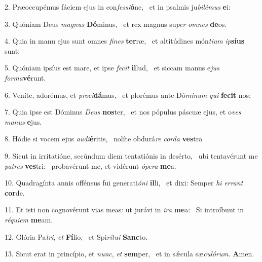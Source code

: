 2. Præoccupémus fáciem ejus in con\textit{fes}\textit{si}\textbf{ó}ne, \ast\  et in psalmis ju\textit{bi}\textit{lé}\textit{mus} \textbf{e}i:\

3. Quóniam Deus \textit{ma}\textit{gnus} \textbf{Dó}minus, \ast\  et rex magnus su\textit{per} \textit{om}\textit{nes} \textbf{de}os.\

4. Quia in manu ejus sunt omnes \textit{fi}\textit{nes} \textbf{ter}ræ, \ast\  et altitúdines món\textit{ti}\textit{um} \textit{ip}\textbf{sí}\textbf{us} sunt;\

5. Quóniam ipsíus est mare, et ipse \textit{fe}\textit{cit} \textbf{il}lud, \ast\  et siccam manus e\textit{jus} \textit{for}\textit{ma}\textbf{vé}runt.\

6. Veníte, adorémus, et \textit{pro}\textit{ci}\textbf{dá}mus, \ast\  et plorémus ante Dó\textit{mi}\textit{num} \textit{qui} \textbf{fe}\textbf{cit} nos:\

7. Quia ipse est Dóminus \textit{De}\textit{us} \textbf{nos}ter, \ast\  et nos pópulus páscuæ ejus, et o\textit{ves} \textit{ma}\textit{nus} \textbf{e}jus.\

8. Hódie si vocem ejus \textit{au}\textit{di}\textbf{é}ritis, \ast\  nolíte obdurá\textit{re} \textit{cor}\textit{da} \textbf{ves}tra\

9. Sicut in irritatióne, secúndum diem tentatiónis in desérto, \dag\  ubi tentavérunt me \textit{pa}\textit{tres} \textbf{ves}tri: \ast\  probavérunt me, et vidérunt \textit{ó}\textit{pe}\textit{ra} \textbf{me}a.\

10. Quadragínta annis offénsus fui generati\textit{ó}\textit{ni} \textbf{il}li, \ast\  et dixi: Semper \textit{hi} \textit{er}\textit{rant} \textbf{cor}de.\

11. Et isti non cognovérunt vias meas: ut jurávi in \textit{i}\textit{ra} \textbf{me}a: \ast\  Si introíbunt in \textit{ré}\textit{qui}\textit{em} \textbf{me}am.\

12. Glória Pa\textit{tri}, \textit{et} \textbf{Fí}lio, \ast\  et Spi\textit{rí}\textit{tu}\textit{i} \textbf{Sanc}to.\

13. Sicut erat in princípio, et \textit{nunc}, \textit{et} \textbf{sem}per, \ast\  et in sǽcula sæ\textit{cu}\textit{ló}\textit{rum}. \textbf{A}men.\

